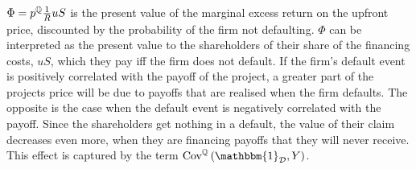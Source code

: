\documentclass[../main.tex]{subfiles}
\begin{document}
        $\Phi = p^{\mathbb{Q}} \frac{1}{R} u S$
        is the present value of the marginal excess return on the upfront price, 
        discounted by the probability of the firm not defaulting.
        $\Phi$ can be interpreted as the present value to the shareholders of their share of the financing costs, $uS$,
        which they pay iff the firm does not default. 
        If the firm's default event is positively correlated with the payoff of the project,
        a greater part of the projects price will be due to payoffs that are realised when the firm defaults.
        The opposite is the case when the default event is negatively correlated with the payoff.
        Since the shareholders get nothing in a default, 
        the value of their claim decreases even more, 
        when they are financing payoffs that they will never receive.
        This effect is captured by the term 
        $\text{Cov}^{\mathbb{Q}}\left(\mathbbm{1}_{\mathcal{D}}, Y\right)$.
\end{document}
